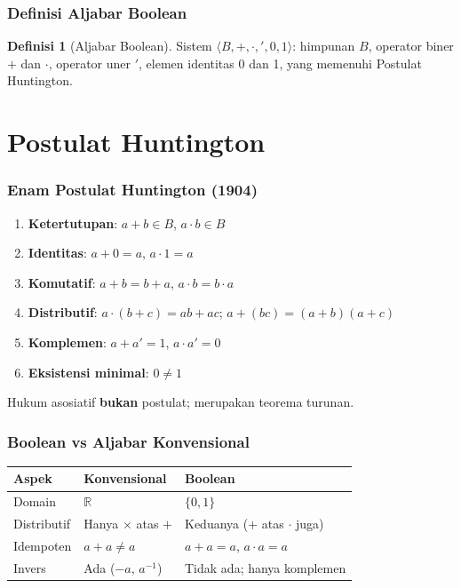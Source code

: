 \documentclass[handout]{beamer}
\theoremstyle{definition}
\newtheorem{definisi}[theorem]{Definisi}
\theoremstyle{example}
\begin{document}
\begin{frame}
\frametitle{Definisi Aljabar Boolean}
\begin{definisi}[Aljabar Boolean]
Sistem $\langle B, +, \cdot, ', 0, 1 \rangle$: himpunan $B$, operator biner $+$ dan $\cdot$, operator uner $'$, elemen identitas 0 dan 1, yang memenuhi Postulat Huntington.
\end{definisi}
\end{frame}

\section{Postulat Huntington}

\begin{frame}
\frametitle{Enam Postulat Huntington (1904)}
\begin{enumerate}
  \item \textbf{Ketertutupan}: $a+b \in B$, $a \cdot b \in B$
  \item \textbf{Identitas}: $a+0=a$, $a \cdot 1 = a$
  \item \textbf{Komutatif}: $a+b=b+a$, $a \cdot b = b \cdot a$
  \item \textbf{Distributif}: $a \cdot (b+c) = ab + ac$; $a + (bc) = (a+b)(a+c)$
  \item \textbf{Komplemen}: $a + a' = 1$, $a \cdot a' = 0$
  \item \textbf{Eksistensi minimal}: $0 \neq 1$
\end{enumerate}
Hukum asosiatif \textbf{bukan} postulat; merupakan teorema turunan.
\end{frame}

\begin{frame}
\frametitle{Boolean vs Aljabar Konvensional}
\begin{center}
\small
\begin{tabular}{|l|l|l|}
\hline
\textbf{Aspek} & \textbf{Konvensional} & \textbf{Boolean} \\ \hline
Domain & $\mathbb{R}$ & $\{0,1\}$ \\ \hline
Distributif & Hanya $\times$ atas $+$ & Keduanya ($+$ atas $\cdot$ juga) \\ \hline
Idempoten & $a+a \neq a$ & $a+a=a$, $a \cdot a = a$ \\ \hline
Invers & Ada ($-a$, $a^{-1}$) & Tidak ada; hanya komplemen \\ \hline
\end{tabular}
\end{center}
\end{frame}
\end{document}
